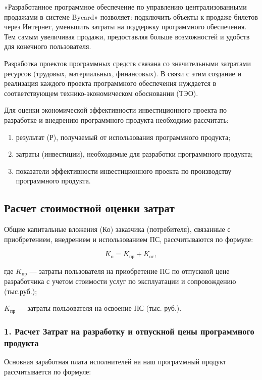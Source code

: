 «Разработанное программное обеспечение по управлению централизованными продажами в системе Bycard» позволяет: подключить объекты к продаже билетов через Интернет, уменьшить затраты на поддержку программного обеспечения. Тем самым увеличивая продажи, предоставляя больше возможностей и удобств для конечного пользователя.

Разработка проектов программных средств связана со значительными затратами ресурсов (трудовых, материальных, финансовых). В связи с этим создание и реализация каждого проекта программного обеспечения нуждается в соответствующем технико-экономическом обосновании (ТЭО).

Для оценки экономической эффективности инвестиционного проекта по разработке и внедрению программного продукта необходимо рассчитать:
\begin{enumerate}
    \item результат (Р), получаемый от использования программного продукта;
    \item затраты (инвестиции), необходимые для разработки программного продукта;
    \item показатели эффективности инвестиционного проекта по производству программного продукта.
\end{enumerate}

\subsection{Расчет стоимостной оценки затрат}

Общие капитальные вложения (Ко) заказчика (потребителя), связанные с приобретением, внедрением и использованием ПС, рассчитываются по формуле:

\begin{displaymath}
  K_{\text{o}} = K_{\text{пр}} + K_{\text{oс}},
\end{displaymath}

где \( K_{\text{пр}} \) --- затраты пользователя на приобретение ПС по отпускной цене разработчика с учетом стоимости услуг по эксплуатации и сопровождению (тыс.руб.);

\( K_{\text{пр}} \) --- затраты пользователя на освоение ПС (тыс. руб.).

\subsubsection{1. Расчет Затрат на разработку и отпускной цены программного продукта}

Основная заработная плата исполнителей на наш программный продукт рассчитывается по формуле:


